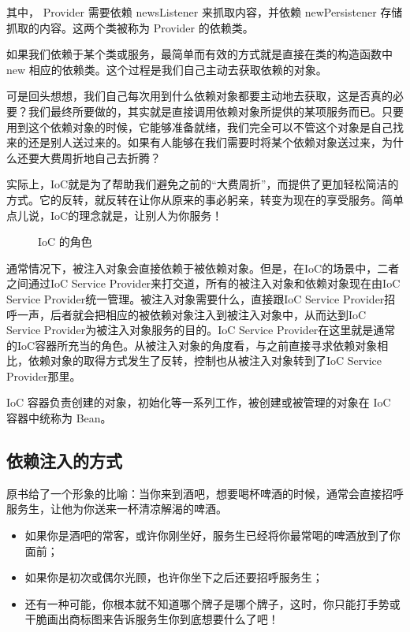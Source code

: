 其中， Provider 需要依赖 newsListener 来抓取内容，并依赖 newPersistener 存储抓取的内容。这两个类被称为 Provider 的依赖类。

如果我们依赖于某个类或服务，最简单而有效的方式就是直接在类的构造函数中 new 相应的依赖类。这个过程是我们自己主动去获取依赖的对象。

可是回头想想，我们自己每次用到什么依赖对象都要主动地去获取，这是否真的必要？我们最终所要做的，其实就是直接调用依赖对象所提供的某项服务而已。只要用到这个依赖对象的时候，它能够准备就绪，我们完全可以不管这个对象是自己找来的还是别人送过来的。如果有人能够在我们需要时将某个依赖对象送过来，为什么还要大费周折地自己去折腾？

实际上，IoC就是为了帮助我们避免之前的“大费周折”，而提供了更加轻松简洁的方式。它的反转，就反转在让你从原来的事必躬亲，转变为现在的享受服务。简单点儿说，IoC的理念就是，让别人为你服务！

\begin{figure}[H]
    \small
    \centering
    \caption{IoC 的角色}
    \label{fig:IoC 的角色}
\end{figure}

通常情况下，被注入对象会直接依赖于被依赖对象。但是，在IoC的场景中，二者之间通过IoC Service Provider来打交道，所有的被注入对象和依赖对象现在由IoC Service Provider统一管理。被注入对象需要什么，直接跟IoC Service Provider招呼一声，后者就会把相应的被依赖对象注入到被注入对象中，从而达到IoC Service Provider为被注入对象服务的目的。IoC Service Provider在这里就是通常的IoC容器所充当的角色。从被注入对象的角度看，与之前直接寻求依赖对象相比，依赖对象的取得方式发生了反转，控制也从被注入对象转到了IoC Service Provider那里。

IoC 容器负责创建的对象，初始化等一系列工作，被创建或被管理的对象在 IoC 容器中统称为 Bean。

\subsection{依赖注入的方式}

原书给了一个形象的比喻：当你来到酒吧，想要喝杯啤酒的时候，通常会直接招呼服务生，让他为你送来一杯清凉解渴的啤酒。
\begin{itemize}
    \item 如果你是酒吧的常客，或许你刚坐好，服务生已经将你最常喝的啤酒放到了你面前；
    \item 如果你是初次或偶尔光顾，也许你坐下之后还要招呼服务生；
    \item 还有一种可能，你根本就不知道哪个牌子是哪个牌子，这时，你只能打手势或干脆画出商标图来告诉服务生你到底想要什么了吧！
\end{itemize}

